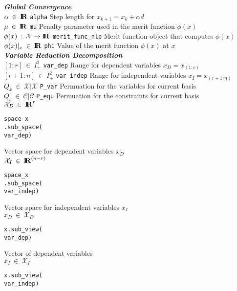 {\begin{tabbing}
\textbf{\textit{Global Convergence}} \\
$\alpha \:\in\: \mbox{\textbf{I}}\hspace{-0.6ex}\mbox{\textbf{R}}$
	\> \texttt{alpha}
		\> Step length for $x_{k+1} = x_{k} + \alpha d$ \\
$\mu \:\in\: \mbox{\textbf{I}}\hspace{-0.6ex}\mbox{\textbf{R}}$
	\> \texttt{mu}
		\> Penalty parameter used in the merit function $\phi(x)$ \\
$\phi(x) \: : \: \mathcal{X} \rightarrow \mbox{\textbf{I}}\hspace{-0.6ex}\mbox{\textbf{R}}$
	\> \texttt{merit\_func\_nlp}
		\> Merit function object that computes $\phi(x)$ \\
$\phi(x)|_x \:\in\: \mbox{\textbf{I}}\hspace{-0.6ex}\mbox{\textbf{R}}$
	\> \texttt{phi}
		\> Value of the merit function $\phi(x)$ at $x$ \\

\textbf{\textit{Variable Reduction Decomposition}} \\
$[1:r] \:\in\:I_{+}^{2}$
	\> \texttt{var\_dep}
		\> Range for dependent variables $x_D = x_{(1:r)}$ \\
$[r+1:n] \:\in\:I_{+}^{2}$
	\> \texttt{var\_indep}
		\> Range for independent variables $x_I = x_{(r+1:n)}$ \\
$Q_x \:\in\:\mathcal{X}|\mathcal{X}$
	\>  \texttt{P\_var}
		\> Permuation for the variables for current basis \\
$Q_c \:\in\:\mathcal{C}|\mathcal{C}$
	\>  \texttt{P\_equ}
		\> Permuation for the constraints for current basis \\
$\mathcal{X}_D \:\in\:\mbox{\textbf{I}}\hspace{-0.6ex}\mbox{\textbf{R}}^r$
	\>  \begin{minipage}[t]{16ex} \texttt{space\_x} \\ \texttt{.sub\_space(} \\ \texttt{var\_dep)} \end{minipage}
		\> Vector space for dependent variables $x_D$ \\
$\mathcal{X}_I \:\in\:\mbox{\textbf{I}}\hspace{-0.6ex}\mbox{\textbf{R}}^{(n-r)}$
	\>  \begin{minipage}[t]{16ex} \texttt{space\_x} \\ \texttt{.sub\_space(} \\ \texttt{var\_indep)} \end{minipage}
		\> Vector space for independent variables $x_I$ \\
$x_D \:\in\: \mathcal{X}_D$
	\>  \begin{minipage}[t]{16ex} \texttt{x.sub\_view(} \\ \texttt{var\_dep)} \end{minipage}
		\> Vector of dependent variables \\
$x_I \:\in\: \mathcal{X}_I$
	\>  \begin{minipage}[t]{16ex} \texttt{x.sub\_view(} \\ \texttt{var\_indep)} \end{minipage}

\end{tabbing}}
